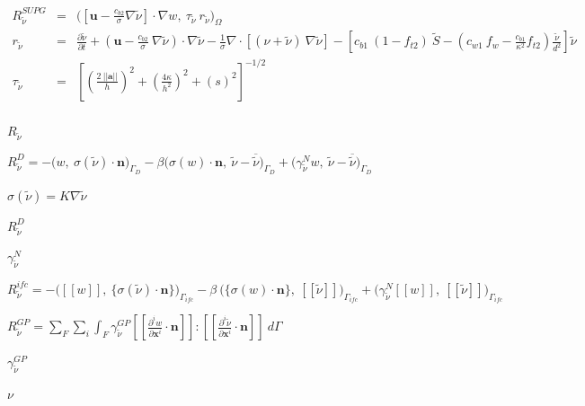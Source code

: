 \documentclass{article}
\begin{document}
$
\begin{array}{lll}
R_{\tilde{\nu}}^{SUPG} & = & 
\displaystyle \bigg( \left[ \mathbf{u} - \frac{c_{b2}}{\sigma} \nabla \tilde{\nu} \right] \cdot \nabla w,\ \tau_{\tilde{\nu}}\ r_{\tilde{\nu}} \bigg)_{\Omega}\\[15pt]

r_{\tilde{\nu}} & = &
\displaystyle \frac{\partial \tilde{\nu}}{\partial t} 
+ \left( \mathbf{u} - \frac{c_{b2}}{\sigma}\ \nabla \tilde{\nu} \right) \cdot \nabla \tilde{\nu} 
- \frac{1}{\sigma} \nabla \cdot \left[ ( \nu + \tilde{\nu} )\ \nabla \tilde{\nu} \right] 
- \left[ c_{b1}\ (1-f_{t2})\ \tilde{S} - \left( c_{w1}\ f_{w} - \frac{c_{b1}}{\kappa^2} f_{t2} \right) \frac{\tilde{\nu}}{d^2} \right] \tilde{\nu}\\[15pt]

\tau_{\tilde{\nu}} & = & 
\displaystyle \left[ \left(\frac{2\ || \mathbf{a} ||}{h} \right)^2 + \left( \frac{4 \kappa}{h^2} \right)^2 + \left( s \right)^2 \right]^{-1/2}\\
\end{array}
$
\pagebreak

$ R_{\tilde{\nu}} $
\pagebreak

$
\displaystyle
R_{\tilde{\nu}}^{D} = 
- \bigg( w,\ \sigma( \tilde{\nu} ) \cdot \mathbf{n} \bigg)_{\Gamma_D}
- \beta \bigg( \sigma( w ) \cdot \mathbf{n},\ \tilde{\nu}- \overline{\tilde{\nu}} \bigg)_{\Gamma_D}
+ \bigg( \gamma^N_{\tilde{\nu}} w,\ \tilde{\nu}- \overline{\tilde{\nu}} \bigg)_{\Gamma_D}
$
\pagebreak

$ \sigma(\tilde{\nu}) = K \nabla \tilde{\nu} $
\pagebreak

$ R_{\tilde{\nu}}^{D} $
\pagebreak

$ \gamma^N_{\tilde{\nu}} $
\pagebreak

$
\displaystyle
R_{\tilde{\nu}}^{ifc} = 
- \bigg( [[w]],\ \{\sigma( \tilde{\nu} ) \cdot \mathbf{n} \} \bigg)_{\Gamma_{ifc}}
- \beta\ \bigg( \{ \sigma( w ) \cdot \mathbf{n} \},\ [[\tilde{\nu}]] \bigg)_{\Gamma_{ifc}}
+ \bigg( \gamma^N_{\tilde{\nu}} [[w]],\ [[\tilde{\nu}]] \bigg)_{\Gamma_{ifc}}
$
\pagebreak

$
\displaystyle
R_{\tilde{\nu}}^{GP} = 
\sum_{F} \sum_{i} \int_{F} \gamma^{GP}_{\tilde{\nu}} [[ \frac{\partial^i w}{\partial \mathbf{x}^i} \cdot \mathbf{n} ]] 
: [[ \frac{\partial^i \tilde{\nu}}{\partial \mathbf{x}^i} \cdot \mathbf{n} ]] \ d\Gamma
$
\pagebreak

$ \gamma^{GP}_{\tilde{\nu}} $
\pagebreak

$ \nu $
\pagebreak
\end{document}
